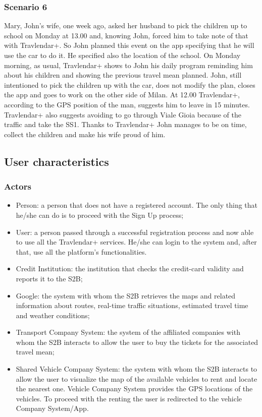 	\subsubsection{Scenario 6}
		Mary, John's wife, one week ago, asked her husband to pick the children up to school on Monday at 13.00 and, knowing John,  forced him to take note of that with Travlendar+.\newline
		So John planned this event on the app specifying that he will use the car to do it.
		He specified also the location of the school.\newline
		On Monday morning, as usual, Travlendar+ shows to John his daily program reminding him about his children and showing the previous travel mean planned.\newline
		John, still intentioned to pick the children up with the car, does not modify the plan, closes the app and goes to work on the other side of Milan.\newline
		At 12.00 Travlendar+, according to the GPS position of the man, suggests him to leave in 15 minutes.
		Travlendar+ also suggests avoiding to go through Viale Gioia because of the traffic and take the SS1.\newline
		Thanks to Travlendar+ John manages to be on time, collect the children and make his wife proud of him. 
\subsection{User characteristics}
	\subsubsection{Actors}
			\begin{itemize}
			\item Person: a person that does not have a registered account. The only thing that he/she can do is to proceed with the Sign Up process;
			\item User: a person passed through a successful registration process and now
			able to use all the Travlendar+ services. He/she can login to the system and, after that, use all
			the platform's functionalities.
			\item Credit Institution: the institution that checks the credit-card validity and reports it to the S2B;
			\item Google: the system with whom the S2B retrieves the maps and related information about routes, real-time traffic situations, estimated travel time and weather conditions;
			\item Transport Company System: the system of the affiliated companies with whom the S2B interacts to allow the user to buy the tickets for the associated travel mean;
			\item Shared Vehicle Company System: the system with whom the S2B interacts to allow the user to visualize the map of the available vehicles to rent and locate the nearest one. Vehicle Company System provides the GPS locations of the vehicles. To proceed with the renting the user is redirected to the vehicle Company System/App.
	
		\end{itemize}
